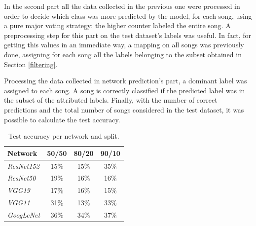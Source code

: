 \documentclass[10pt,twocolumn,letterpaper]{article}
\begin{document}
In the second part all the data collected in the previous one were processed in order to decide which class was more predicted by the model, for each song, using a pure major voting strategy: the higher counter labeled the entire song. A preprocessing step for this part on the test dataset's labels was useful. In fact, for getting this values in an immediate way, a mapping on all songs was previously done, assigning for each song all the labels belonging to the subset obtained in Section \ref{filtering}.

Processing the data collected in network prediction's part, a dominant label was assigned to each song. A song is correctly classified if the predicted label was in the subset of the attributed labels. Finally, with the number of correct predictions and the total number of songs considered in the test dataset, it was possible to calculate the test accuracy.



   \begin{table}[ht]
      \begin{center}
      \def\arraystretch{1.5}
      \begin{tabular}{l|c|c|c}
         \textbf{Network} & \textbf{50/50} & \textbf{80/20} & \textbf{90/10} \\
      \hline
      \textit{ResNet152} & 15\% & 15\% & 35\% \\
      \hline
      \textit{ResNet50} & 19\% & 16\% & 16\% \\
      \hline
      \textit{VGG19} & 17\% & 16\% & 15\% \\
      \hline
      \textit{VGG11} & 31\% & 13\% & 33\% \\
      \hline
      \textit{GoogLeNet} & 36\% & 34\% & 37\% \\
      \end{tabular}
      \end{center}
      \caption{Test accuracy per network and split.}
      \label{tab:test}
      \end{table}
\end{document}
